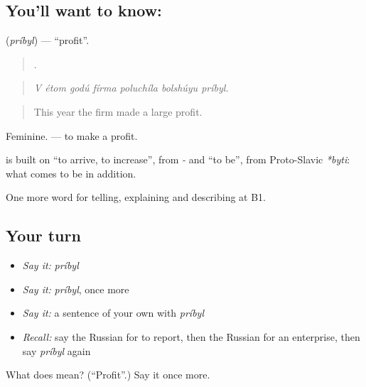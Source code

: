 \subsection*{You'll want to know: }
\textbf{} (\emph{príbyl}) — \textquotedblleft{}profit\textquotedblright{}.

\begin{quote}
      .
\end{quote}

\begin{quote}
\emph{V étom godú fírma poluchíla bolshúyu príbyl.}
\end{quote}

\begin{quote}
This year the firm made a large profit.
\end{quote}

Feminine. \emph{ } — to make a profit.

\begin{cousinweb}
\textbf{} is built on \emph{} \textquotedblleft{}to arrive, to increase\textquotedblright{}, from \emph{-} and \emph{} \textquotedblleft{}to be\textquotedblright{}, from Proto-Slavic \emph{*byti}: what comes to be in addition.
\end{cousinweb}

\begin{grammarlens}[title={What you've built}]
One more word for telling, explaining and describing at B1.
\end{grammarlens}

\subsection*{Your turn}
\begin{itemize}
\raggedright
  \item \emph{Say it:} \emph{príbyl}
  \item \emph{Say it:} \emph{príbyl}, once more
  \item \emph{Say it:} a sentence of your own with \emph{príbyl}
  \item \emph{Recall:} say the Russian for to report, then the Russian for an enterprise, then say \emph{príbyl} again
\end{itemize}

\begin{tcolorbox}[breakable,colback=teal!4,colframe=teal!35!black,title={Before you move on}]
What does  mean? (\textquotedblleft{}Profit\textquotedblright{}.) Say it once more.
\end{tcolorbox}
